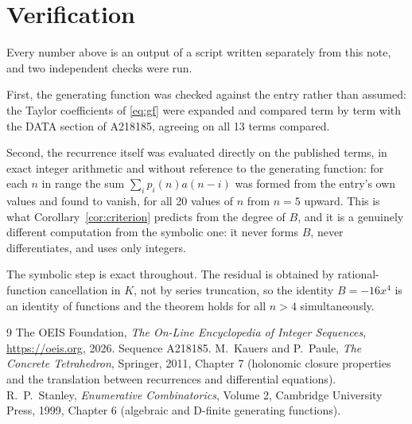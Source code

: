 \documentclass[11pt,a4paper]{article}
\theoremstyle{plain}
\theoremstyle{definition}
\begin{document}
\section{Verification}

Every number above is an output of a script written separately from this note, and two
independent checks were run.

First, the generating function was checked against the entry rather than assumed: the
Taylor coefficients of \eqref{eq:gf} were expanded and compared term by term with the DATA
section of A218185, agreeing on all 13 terms compared.

Second, the recurrence itself was evaluated directly on the published terms, in exact
integer arithmetic and without reference to the generating function: for each $n$ in range
the sum $\sum_{i}p_{i}(n)a(n-i)$ was formed from the entry's own values and found to
vanish, for all 20 values of $n$ from $n=5$ upward. This is what
Corollary~\ref{cor:criterion} predicts from the degree of $B$, and it is a genuinely
different computation from the symbolic one: it never forms $B$, never differentiates, and
uses only integers.

The symbolic step is exact throughout. The residual is obtained by rational-function
cancellation in $K$, not by series truncation, so the identity $B=- 16 x^{4}$ is an
identity of functions and the theorem holds for all $n>4$ simultaneously.

\begin{thebibliography}{9}
 The OEIS Foundation, \emph{The On-Line Encyclopedia of Integer Sequences},
\url{https://oeis.org}, 2026. Sequence A218185.
 M.~Kauers and P.~Paule, \emph{The Concrete Tetrahedron}, Springer, 2011,
Chapter 7 (holonomic closure properties and the translation between recurrences and
differential equations).
 R.~P.~Stanley, \emph{Enumerative Combinatorics}, Volume 2, Cambridge
University Press, 1999, Chapter 6 (algebraic and D-finite generating functions).
\end{thebibliography}
\end{document}
